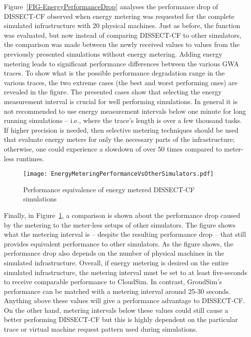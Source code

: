 \documentclass[sort, compress, 5p]{elsarticle}
\begin{document}
Figure~\ref{FIG-EnergyPerformanceDrop} analyses the performance drop of DISSECT-CF observed when energy metering was requested for the complete simulated infrastructure with 20 physical machines. Just as before, the function  was evaluated, but now instead of comparing DISSECT-CF to other simulators, the comparison was made between the newly received values to values from the previously presented simulations without energy metering. Adding energy metering leads to significant performance differences between the various GWA traces. To show what is the possible performance degradation range in the various traces, the two extreme cases (the best and worst performing ones) are revealed in the figure. The presented cases show that selecting the energy measurement interval is crucial for well performing simulations. In general it is not recommended to use energy measurement intervals below one minute for long running simulations -- i.e., where the trace's length is over a few thousand tasks. If higher precision is needed, then selective metering techniques should be used that evaluate energy meters for only the necessary parts of the infrastructure; otherwise, one could experience a slowdown of over 50 times compared to meter-less runtimes.

\begin{figure}[tb]
\texttt{[image: EnergyMeteringPerformanceVsOtherSimulators.pdf]}
\caption{Performance equivalence of energy metered DISSECT-CF simulations\label{FIG-EnergyEquivalence}}
\end{figure}
Finally, in Figure~\ref{FIG-EnergyEquivalence}, a comparison is shown about the performance drop caused by the metering to the meter-less setups of other simulators. The figure shows what the metering interval is -- despite the resulting performance drop -- that still provides equivalent performance to other simulators. As the figure shows, the performance drop also depends on the number of physical machines in the simulated infrastructure. Overall, if energy metering is desired on the entire simulated infrastructure, the metering interval must be set to at least five-seconds to receive comparable performance to CloudSim. In contrast, GroudSim's performance can be matched with a metering interval around 25-30 seconds. Anything above these values will give a performance advantage to DISSECT-CF. On the other hand, metering intervals below these values could still cause a better performing DISSECT-CF but this is highly dependent on the particular trace or virtual machine request pattern used during simulations.
\end{document}
